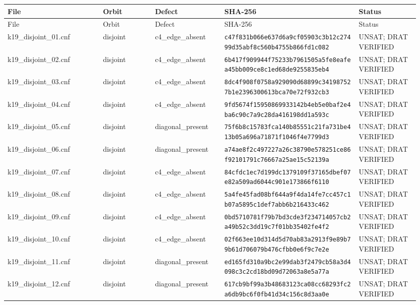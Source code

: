 \documentclass[11pt]{article}
\newcommand{\hash}[2]{\texttt{#1}\newline\texttt{#2}}
\begin{document}
\scriptsize
\begin{longtable}{>{\ttfamily}p{0.22\linewidth}p{0.12\linewidth}p{0.16\linewidth}p{0.31\linewidth}p{0.14\linewidth}}
\toprule
File & Orbit & Defect & SHA-256 & Status\\
\midrule
\endfirsthead
\toprule
File & Orbit & Defect & SHA-256 & Status\\
\midrule
\endhead
k19\_disjoint\_01.cnf & disjoint & c4\_edge\_absent & \hash{c47f831b066e637d6a9cf05903c3b12c}{27499d35abf8c560b4755b866fd1c082} & UNSAT; DRAT VERIFIED \\
k19\_disjoint\_02.cnf & disjoint & c4\_edge\_absent & \hash{6b417f909944f75233b7961505a5fe8e}{afea45bb009ce8c1ed68de9255835eb4} & UNSAT; DRAT VERIFIED \\
k19\_disjoint\_03.cnf & disjoint & c4\_edge\_absent & \hash{8dc4f908f0758a929090d68899c34198}{7527b1e2396300613bca70e72f932cb3} & UNSAT; DRAT VERIFIED \\
k19\_disjoint\_04.cnf & disjoint & c4\_edge\_absent & \hash{9fd5674f15950869933142b4eb5e0baf}{2e4ba6c90c7a9c28da416198dd1a593c} & UNSAT; DRAT VERIFIED \\
k19\_disjoint\_05.cnf & disjoint & diagonal\_present & \hash{75f6b8c15783fca140b85551c21fa731}{be413b05a696a71871f1046f4e7799d3} & UNSAT; DRAT VERIFIED \\
k19\_disjoint\_06.cnf & disjoint & diagonal\_present & \hash{a74ae8f2c497227a26c38790e578251c}{e86f92101791c76667a25ae15c52139a} & UNSAT; DRAT VERIFIED \\
k19\_disjoint\_07.cnf & disjoint & c4\_edge\_absent & \hash{84cfdc1ec7d199dc1379109f37165dbe}{f07e82a509ad6044c901e173866f6110} & UNSAT; DRAT VERIFIED \\
k19\_disjoint\_08.cnf & disjoint & c4\_edge\_absent & \hash{5a4fe45fad08bf644a9f4da14fe7cc45}{7c1b07a5895c1def7abb6b216433c462} & UNSAT; DRAT VERIFIED \\
k19\_disjoint\_09.cnf & disjoint & c4\_edge\_absent & \hash{0bd5710781f79b7bd3cde3f234714057}{cb2a49b52c3dd19c7f01bb35402fe4f2} & UNSAT; DRAT VERIFIED \\
k19\_disjoint\_10.cnf & disjoint & c4\_edge\_absent & \hash{02f663ee10d314d5d70ab83a2913f9e8}{9b79b61d706079b476cfbb0e6f9c7e2e} & UNSAT; DRAT VERIFIED \\
k19\_disjoint\_11.cnf & disjoint & diagonal\_present & \hash{ed165fd310a9bc2e99dab3f2479cb58a}{3d4098c3c2cd18bd09d72063a8e5a77a} & UNSAT; DRAT VERIFIED \\
k19\_disjoint\_12.cnf & disjoint & diagonal\_present & \hash{617cb9bf99a3b48683123ca08cc68293}{fc2a6db9bc6f0fb41d34c156c8d3aa0e} & UNSAT; DRAT VERIFIED \\

\end{longtable}
\end{document}
